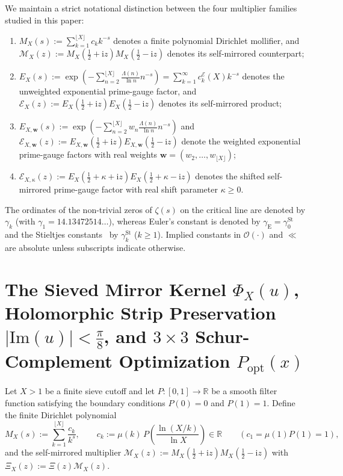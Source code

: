 \documentclass[11pt,reqno]{amsart}
\theoremstyle{definition}
\theoremstyle{remark}
\numberwithin{equation}{section}
\newcommand{\R}{\mathbb{R}}
\newcommand{\ii}{\mathrm{i}}
\newcommand{\Ima}{\mathrm{Im}}
\begin{document}
We maintain a strict notational distinction between the four multiplier families studied in this paper:
\begin{enumerate}[label=\textup{(\alph*)},leftmargin=2.2em]
\item $M_X(s) := \sum_{k=1}^{\lfloor X\rfloor} c_k k^{-s}$ denotes a finite polynomial Dirichlet mollifier, and $\mathcal{M}_X(z) := M_X(\frac{1}{2}+\ii z)M_X(\frac{1}{2}-\ii z)$ denotes its self-mirrored counterpart;
\item $E_X(s) := \exp(-\sum_{n=2}^{\lfloor X\rfloor} \frac{\Lambda(n)}{\ln n}n^{-s}) = \sum_{k=1}^{\infty} c_k^{\mathcal{E}}(X)k^{-s}$ denotes the unweighted exponential prime-gauge factor, and $\mathcal{E}_X(z) := E_X(\frac{1}{2}+\ii z)E_X(\frac{1}{2}-\ii z)$ denotes its self-mirrored product;
\item $E_{X,\mathbf{w}}(s) := \exp(-\sum_{n=2}^{\lfloor X\rfloor} w_n\frac{\Lambda(n)}{\ln n}n^{-s})$ and $\mathcal{E}_{X,\mathbf{w}}(z) := E_{X,\mathbf{w}}(\frac{1}{2}+\ii z)E_{X,\mathbf{w}}(\frac{1}{2}-\ii z)$ denote the weighted exponential prime-gauge factors with real weights $\mathbf{w} = (w_2, \dots, w_{\lfloor X\rfloor})$;
\item $\mathcal{E}_{X,\kappa}(z) := E_X(\frac{1}{2}+\kappa+\ii z)E_X(\frac{1}{2}+\kappa-\ii z)$ denotes the shifted self-mirrored prime-gauge factor with real shift parameter $\kappa \ge 0$.
\end{enumerate}
The ordinates of the non-trivial zeros of $\zeta(s)$ on the critical line are denoted by $\gamma_k$ (with $\gamma_1 = 14.13472514\dots$), whereas Euler's constant is denoted by $\gamma_{\mathrm{E}} = \gamma_0^{\mathrm{St}}$ and the Stieltjes constants~\cite{stieltjes1885} by $\gamma_k^{\mathrm{St}}$ ($k \ge 1$). Implied constants in $\mathcal{O}(\cdot)$ and $\ll$ are absolute unless subscripts indicate otherwise.

\section{The Sieved Mirror Kernel $\Phi_X(u)$, Holomorphic Strip Preservation $|\Ima(u)| < \frac{\pi}{8}$, and $3\times 3$ Schur-Complement Optimization $P_{\mathrm{opt}}(x)$}\label{sec:sieved_mirror}

Let $X > 1$ be a finite sieve cutoff and let $P : [0,1] \to \R$ be a smooth filter function satisfying the boundary conditions $P(0) = 0$ and $P(1) = 1$. Define the finite Dirichlet polynomial
\begin{equation}\label{eq:MX_def}
M_X(s) := \sum_{k=1}^{\lfloor X\rfloor} \frac{c_k}{k^s}, \qquad c_k := \mu(k)\,P\!\left(\frac{\ln(X/k)}{\ln X}\right) \in \R \qquad (c_1 = \mu(1)P(1) = 1),
\end{equation}
and the self-mirrored multiplier $\mathcal{M}_X(z) := M_X(\frac{1}{2}+\ii z)M_X(\frac{1}{2}-\ii z)$ with $\Xi_X(z) := \Xi(z)\mathcal{M}_X(z)$.
\end{document}

